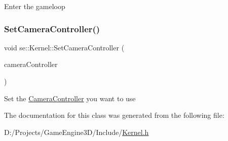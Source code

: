 Enter the gameloop \mbox{\label{classse_1_1_kernel_a60a807b4f4e928752e7512f5b7b4a17c}} 
\subsubsection{\texorpdfstring{Set\+Camera\+Controller()}{SetCameraController()}}
{\footnotesize\ttfamily void se\+::\+Kernel\+::\+Set\+Camera\+Controller (\begin{DoxyParamCaption}\item[{\mbox{\hyperlink{classse_1_1_camera_controller}{Camera\+Controller}} $\ast$}]{camera\+Controller }\end{DoxyParamCaption})}

Set the \mbox{\hyperlink{classse_1_1_camera_controller}{Camera\+Controller}} you want to use 

The documentation for this class was generated from the following file\+:\begin{DoxyCompactItemize}
\item 
D\+:/\+Projects/\+Game\+Engine3\+D/\+Include/\mbox{\hyperlink{_kernel_8h}{Kernel.\+h}}\end{DoxyCompactItemize}

